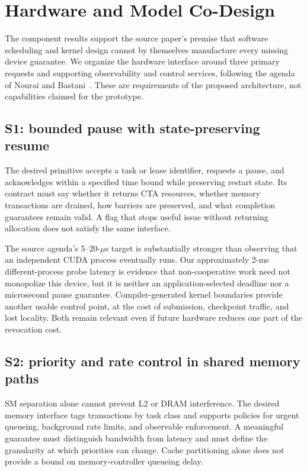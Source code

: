\section{Hardware and Model Co-Design}
\label{sec:hardware}
The component results support the source paper's premise that software
scheduling and kernel design cannot by themselves manufacture every missing
device guarantee. We organize the hardware interface around three primary
requests and supporting observability and control services, following the
agenda of Nourai and Bastani~\cite{Nourai2026GPUOS}. These are requirements
of the proposed architecture, not capabilities claimed for the prototype.

\subsection{S1: bounded pause with state-preserving resume}
The desired primitive accepts a task or lease identifier, requests a pause,
and acknowledges within a specified time bound while preserving restart
state. Its contract must say whether it returns CTA resources, whether
memory transactions are drained, how barriers are preserved, and what
completion guarantees remain valid. A flag that stops useful issue without
returning allocation does not satisfy the same interface.

The source agenda's 5--20-$\mu$s target is substantially stronger than
observing that an independent CUDA process eventually runs. Our approximately
2-ms different-process probe latency is evidence that non-cooperative work
need not monopolize this device, but it is neither an application-selected
deadline nor a microsecond pause guarantee. Compiler-generated kernel
boundaries provide another usable control point, at the cost of submission,
checkpoint traffic, and lost locality. Both remain relevant even if future
hardware reduces one part of the revocation cost.

\subsection{S2: priority and rate control in shared memory paths}
SM separation alone cannot prevent L2 or DRAM interference. The desired
memory interface tags transactions by task class and supports policies for
urgent queueing, background rate limits, and observable enforcement. A
meaningful guarantee must distinguish bandwidth from latency and must define
the granularity at which priorities can change. Cache partitioning alone
does not provide a bound on memory-controller queueing delay.

